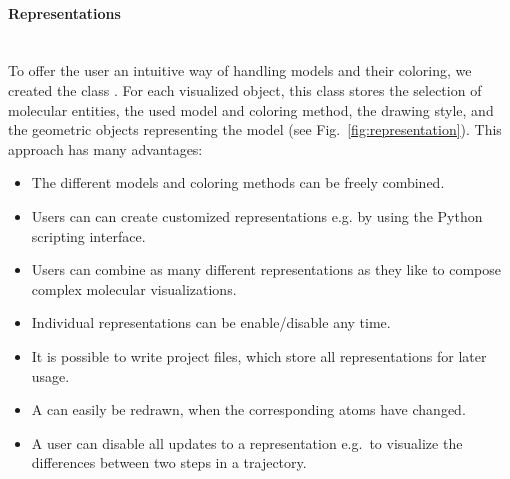 \paragraph{Representations}
\hspace*{\fill}\\
To offer the user an intuitive way of handling models and their coloring,
we created the class . 
For each visualized object, this class stores the selection of molecular entities, the used 
model and coloring method, the drawing style, and the geometric objects representing the 
model (see Fig.~\ref{fig:representation}).
This approach has many advantages:
\begin{itemize}
\item 
The different models and coloring methods can be freely combined.
\item
Users can can create customized representations e.g. by using the Python scripting interface.
\item
Users can combine as many different representations as they like to compose complex molecular visualizations.
\item
Individual representations can be enable/disable any time.
\item
It is possible to write project files, which store all representations for later usage.
\item
A  can easily be redrawn, when the corresponding atoms have changed.
\item
A user can disable all updates to a representation
e.g.\ to visualize the differences between two steps in a trajectory.
\end{itemize}

